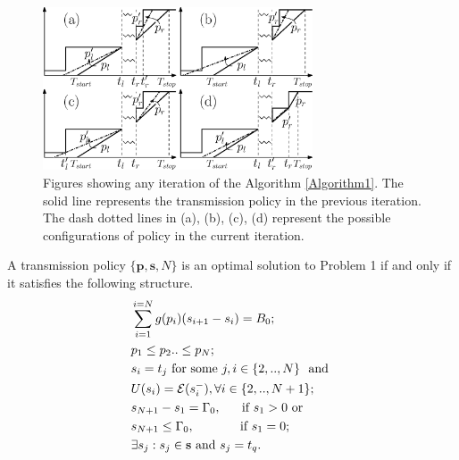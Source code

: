 \begin{figure}
\centering
  \centerline{\includegraphics[width=8cm]{Algorithm1.eps}}
\caption{Figures showing any iteration of the Algorithm \ref{Algorithm1}. The solid line represents the transmission policy in the previous iteration. The dash dotted lines in (a), (b), (c), (d) represent the possible configurations of policy in the current iteration.}\label{figure_Algorithm1}
\end{figure}
 
\begin{theorem}
A transmission policy $\{\textbf{p},\textbf{s},N\}$ is an optimal solution to Problem 1 if and only if it satisfies the following structure.
\label{th_algo1_1}
\begin{align}
&\sum_{i=1}^{i=N}g(p_i)(s_{i+1}-s_i)=B_0; 								
\label{claim1}
\\
&p_1\le p_2 ..\le p_N;
\label{claim3}  
\\
&\nonumber s_i=t_j \text{ for some } j, i\in \{2,..,N\} \ \text{ and }
\\
& U(s_i)=\ETx(s_i^-), \forall i\in \{2,..,N+1\};
\label{claim4}
\\
&\nonumber s_{N+1}-s_1=\TRx_0, 	 \ \ \ \ 						\text{ if } s_1>0 \text{ or }
\\
& s_{N+1}\le \TRx_0,				\ \ \ \ \ \ \ \ \ \				\text{ if } s_1=0;
\label{claim2}
\\
&\exists s_j:s_j\in \textbf{s} \text{ and } s_j=t_q.
\label{claim5}
\end{align}
\end{theorem}

